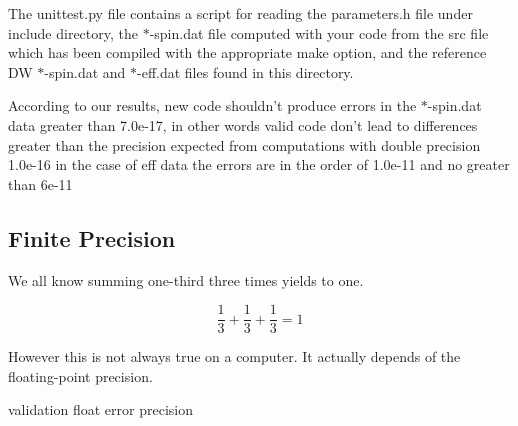 The unittest.py file contains a script for reading the parameters.h file under include 
directory, the $*$-spin.dat file computed with your code from the src file which has been
compiled with the appropriate make option, and the reference DW $*$-spin.dat and $*$-eff.dat
files found in this directory.

According to our results, new code shouldn't produce errors in the $*$-spin.dat data 
greater than 7.0e-17, in other words valid code don't lead to differences greater than
the precision expected from computations with double precision 1.0e-16 in the case of
eff data the errors are in the order of 1.0e-11 and no greater than 6e-11



\subsection{Finite Precision}


We all know summing one-third three times yields to one.

$$\dfrac{1}{3} + \dfrac{1}{3} + \dfrac{1}{3} = 1$$

 However this is not always true on a computer. It actually depends of the floating-point precision.
 
 
  
  
validation float error precision





